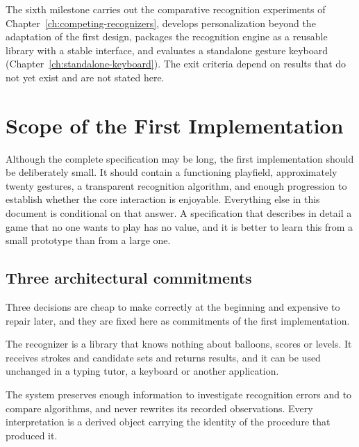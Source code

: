 The sixth milestone carries out the comparative recognition experiments of Chapter~\ref{ch:competing-recognizers}, develops personalization beyond the adaptation of the first design, packages the recognition engine as a reusable library with a stable interface, and evaluates a standalone gesture keyboard (Chapter~\ref{ch:standalone-keyboard}). The exit criteria depend on results that do not yet exist and are not stated here.

\chapter{Scope of the First Implementation}\label{ch:first-scope}

Although the complete specification may be long, the first implementation should be deliberately small. It should contain a functioning playfield, approximately twenty gestures, a transparent recognition algorithm, and enough progression to establish whether the core interaction is enjoyable. Everything else in this document is conditional on that answer. A specification that describes in detail a game that no one wants to play has no value, and it is better to learn this from a small prototype than from a large one.

\section{Three architectural commitments}

Three decisions are cheap to make correctly at the beginning and expensive to repair later, and they are fixed here as commitments of the first implementation.

\begin{principle}\label{pr:A1}
The recognizer is a library that knows nothing about balloons, scores or levels. It receives strokes and candidate sets and returns results, and it can be used unchanged in a typing tutor, a keyboard or another application.
\end{principle}

\begin{principle}\label{pr:A2}
The system preserves enough information to investigate recognition errors and to compare algorithms, and never rewrites its recorded observations. Every interpretation is a derived object carrying the identity of the procedure that produced it.
\end{principle}


